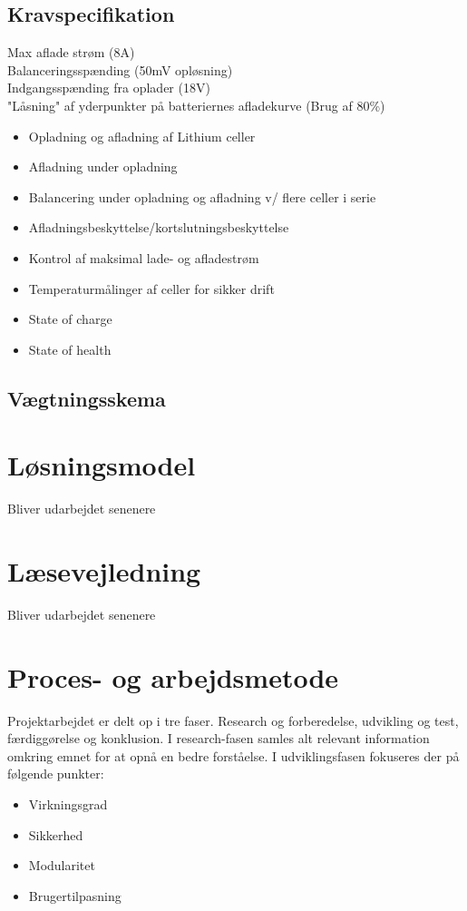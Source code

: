 \subsection{Kravspecifikation} \label{afs:kravspecifikation}
Max aflade strøm (8A) \\
Balanceringsspænding (50mV opløsning) \\
Indgangsspænding fra oplader (18V)\\
"Låsning" af yderpunkter på batteriernes afladekurve (Brug af 80\%)



\begin{itemize}
	\item Opladning og afladning af Lithium celler
	\item Afladning under opladning
	\item Balancering under opladning og afladning v/ flere celler i serie
	\item Afladningsbeskyttelse/kortslutningsbeskyttelse
	\item Kontrol af maksimal lade- og afladestrøm
	\item Temperaturmålinger af celler for sikker drift
	\item State of charge
	\item State of health
\end{itemize}

\subsection{Vægtningsskema}

\section{Løsningsmodel}
Bliver udarbejdet senenere

\section{Læsevejledning}
Bliver udarbejdet senenere

\section{Proces- og arbejdsmetode}
Projektarbejdet er delt op i tre faser. Research og forberedelse, udvikling og test, færdiggørelse og konklusion. I research-fasen samles alt relevant information omkring emnet for at opnå en bedre forståelse. I udviklingsfasen fokuseres der på følgende punkter: 
\begin{itemize}
	\item Virkningsgrad
	\item Sikkerhed
	\item Modularitet
	\item Brugertilpasning
\end{itemize}


